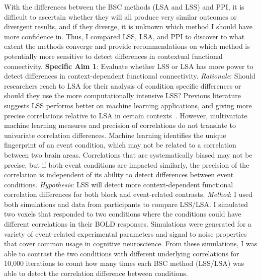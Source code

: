 \documentclass[phd,appendix,figures]{uithesis}
\begin{document}
With the differences between the BSC methods (LSA and LSS) and PPI, it is difficult to ascertain whether
they will all produce very similar outcomes or divergent results, and if they 
diverge, it is unknown which method I should have more confidence in.
Thus, I compared LSS, LSA, and PPI to discover to what extent the methods converge and provide
recommendations on which method is potentially more sensitive to detect
differences in contextual functional connectivity.
\newline
\newline
\textbf{Specific Aim 1}: Evaluate whether LSS or LSA has more power to detect
differences in context-dependent functional connectivity.
\newline
\newline
\textit{Rationale}: Should researchers reach to LSA for their analysis of condition specific differences
or should they use the more computationally intensive LSS?
Previous literature suggests LSS performs better on machine learning applications, and giving
more precise correlations relative to LSA in certain contexts~\cite{Abdulrahman2016,Mumford2012,Turner2012a,Cisler2012}.
However, multivariate machine learning measures and precision of correlations do not translate to
univariate correlation differences.
Machine learning identifies the unique fingerprint of an event condition, which may not be related
to a correlation between two brain areas.
Correlations that are systematically biased may not be precise, but if both event conditions are
impacted similarly, the precision of the correlation is independent of its ability to
detect differences between event conditions.
\newline
\newline
\textit{Hypothesis}:
LSS will detect more context-dependent functional correlation differences for both block and event-related contrasts.
\newline
\newline
\textit{Method}:
I used both simulations and data from participants to compare LSS/LSA.
I simulated two voxels that responded to two conditions where the conditions
could have different correlations in their BOLD responses.
Simulations were generated for a variety of event-related experimental parameters and
signal to noise properties that cover common usage in cognitive neuroscience.
From these simulations, I was able to contrast the two conditions with different
underlying correlations for 10,000  iterations to count how many times
each BSC method (LSS/LSA) was able to detect the correlation difference between conditions.
\end{document}

